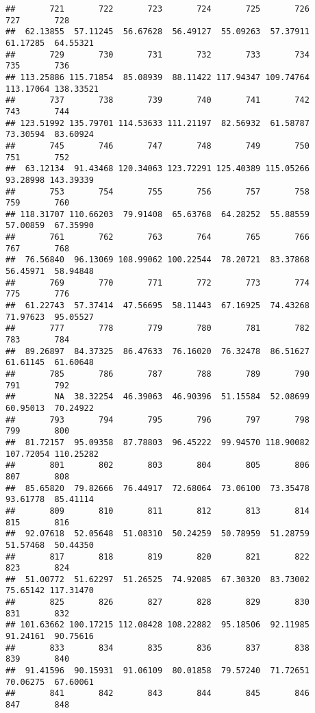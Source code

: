 \documentclass[
]{article}
\begin{document}
\begin{verbatim}
##       721       722       723       724       725       726       727       728 
##  62.13855  57.11245  56.67628  56.49127  55.09263  57.37911  61.17285  64.55321 
##       729       730       731       732       733       734       735       736 
## 113.25886 115.71854  85.08939  88.11422 117.94347 109.74764 113.17064 138.33521 
##       737       738       739       740       741       742       743       744 
## 123.51992 135.79701 114.53633 111.21197  82.56932  61.58787  73.30594  83.60924 
##       745       746       747       748       749       750       751       752 
##  63.12134  91.43468 120.34063 123.72291 125.40389 115.05266  93.28998 143.39339 
##       753       754       755       756       757       758       759       760 
## 118.31707 110.66203  79.91408  65.63768  64.28252  55.88559  57.00859  67.35990 
##       761       762       763       764       765       766       767       768 
##  76.56840  96.13069 108.99062 100.22544  78.20721  83.37868  56.45971  58.94848 
##       769       770       771       772       773       774       775       776 
##  61.22743  57.37414  47.56695  58.11443  67.16925  74.43268  71.97623  95.05527 
##       777       778       779       780       781       782       783       784 
##  89.26897  84.37325  86.47633  76.16020  76.32478  86.51627  61.61145  61.60648 
##       785       786       787       788       789       790       791       792 
##        NA  38.32254  46.39063  46.90396  51.15584  52.08699  60.95013  70.24922 
##       793       794       795       796       797       798       799       800 
##  81.72157  95.09358  87.78803  96.45222  99.94570 118.90082 107.72054 110.25282 
##       801       802       803       804       805       806       807       808 
##  85.65820  79.82666  76.44917  72.68064  73.06100  73.35478  93.61778  85.41114 
##       809       810       811       812       813       814       815       816 
##  92.07618  52.05648  51.08310  50.24259  50.78959  51.28759  51.57468  50.44350 
##       817       818       819       820       821       822       823       824 
##  51.00772  51.62297  51.26525  74.92085  67.30320  83.73002  75.65142 117.31470 
##       825       826       827       828       829       830       831       832 
## 101.63662 100.17215 112.08428 108.22882  95.18506  92.11985  91.24161  90.75616 
##       833       834       835       836       837       838       839       840 
##  91.41596  90.15931  91.06109  80.01858  79.57240  71.72651  70.06275  67.60061 
##       841       842       843       844       845       846       847       848 

\end{verbatim}
\end{document}

